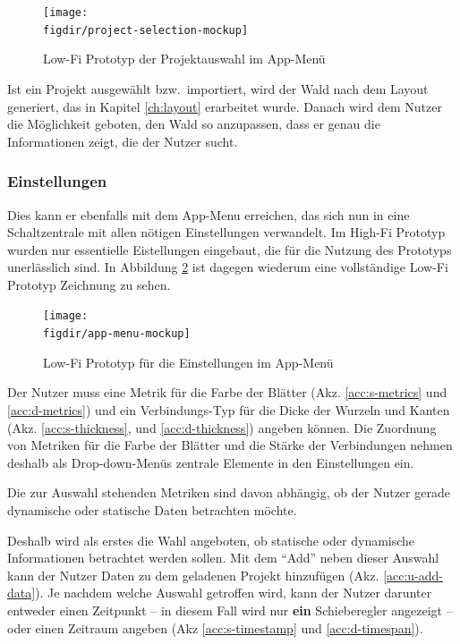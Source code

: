 \begin{figure}[htb]
  \texttt{[image: \\figdir/project-selection-mockup]}
  \caption{Low-Fi Prototyp der Projektauswahl im App-Menü}
  \label{fig:project-selection-mockup}
\end{figure}

Ist ein Projekt ausgewählt bzw.\ importiert, wird der Wald nach dem Layout generiert, das in Kapitel \ref{ch:layout} erarbeitet wurde. Danach wird dem Nutzer die Möglichkeit geboten, den Wald so anzupassen, dass er genau die Informationen zeigt, die der Nutzer sucht.

\subsubsection*{Einstellungen}

Dies kann er ebenfalls mit dem App-Menu erreichen, das sich nun in eine Schaltzentrale mit allen nötigen Einstellungen verwandelt. Im High-Fi Prototyp wurden nur essentielle Eistellungen eingebaut, die für die Nutzung des Prototyps unerlässlich sind. In Abbildung \ref{fig:settings} ist dagegen wiederum eine vollständige Low-Fi Prototyp Zeichnung zu sehen.

\begin{figure}[htb]
  \texttt{[image: \\figdir/app-menu-mockup]}
  \caption{Low-Fi Prototyp für die Einstellungen im App-Menü}
  \label{fig:settings}
\end{figure}

Der Nutzer muss eine Metrik für die Farbe der Blätter (Akz. \ref{acc:s-metrics} und \ref{acc:d-metrics}) und ein Verbindungs-Typ für die Dicke der Wurzeln und Kanten (Akz. \ref{acc:s-thickness},  und \ref{acc:d-thickness}) angeben können. Die Zuordnung von Metriken für die Farbe der Blätter und die Stärke der Verbindungen nehmen deshalb als Drop-down-Menüs zentrale Elemente in den Einstellungen ein.

Die zur Auswahl stehenden Metriken sind davon abhängig, ob der Nutzer gerade dynamische oder statische Daten betrachten möchte.

Deshalb wird als erstes die Wahl angeboten, ob statische oder dynamische Informationen betrachtet werden sollen. Mit dem "`Add"' neben dieser Auswahl kann der Nutzer Daten zu dem geladenen Projekt hinzufügen (Akz. \ref{acc:u-add-data}). Je nachdem welche Auswahl getroffen wird, kann der Nutzer darunter entweder einen Zeitpunkt -- in diesem Fall wird nur \textbf{ein} Schieberegler angezeigt -- oder einen Zeitraum angeben (Akz \ref{acc:s-timestamp} und \ref{acc:d-timespan}).

